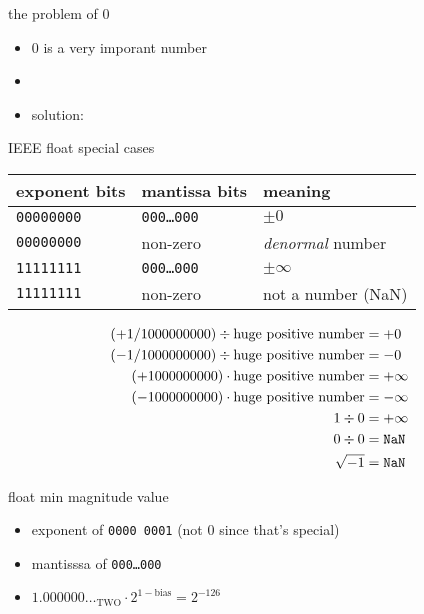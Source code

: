 \begin{frame}{the problem of 0}
\begin{itemize}
\item 0 is a very imporant number
\item {}
\vspace{.5cm}
\item solution: 
\end{itemize}
\end{frame}

\begin{frame}{IEEE float special cases}
\begin{tabular}{llp{5cm}}
exponent bits & mantissa bits & meaning \\ \hline
{\tt 00000000} & {\tt 000\ldots000} & $\pm 0$\\
{\tt 00000000} & non-zero & \textit{denormal} number \\
{\tt 11111111} & {\tt 000\ldots000} & $\pm \infty$ \\
{\tt 11111111} & non-zero & not a number (NaN) \\
\end{tabular}
\small
\begin{eqnarray*}
(+1/1000000000) \div \text{huge positive number} &= +0 \\
(-1/1000000000) \div \text{huge positive number} &= -0 \\
(+1000000000) \cdot \text{huge positive number} &= +\infty \\
(-1000000000) \cdot \text{huge positive number} &= -\infty \\
1 \div 0 &= +\infty \\
0 \div 0 &= \text{\tt NaN} \\ \sqrt{-1} &= \text{\tt NaN} \\
\end{eqnarray*}
\end{frame}

\begin{frame}{float min magnitude value}
\begin{itemize}
\item exponent of {\tt 0000 0001}  (not 0 since that's special)
\item mantisssa of {\tt 000\ldots000}
\item $1.000000\ldots_\text{TWO} \cdot 2^{1-\text{bias}} = 2^{-126}$
\end{itemize}
\end{frame}

